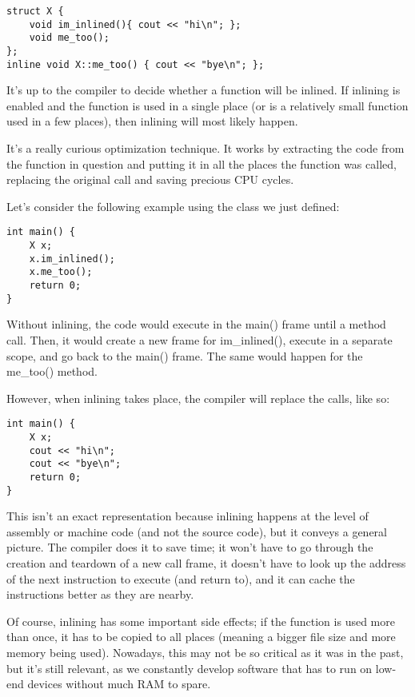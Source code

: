 \begin{lstlisting}[style=styleCXX]
struct X {
	void im_inlined(){ cout << "hi\n"; };
	void me_too();
};
inline void X::me_too() { cout << "bye\n"; };
\end{lstlisting} 

It's up to the compiler to decide whether a function will be inlined. If inlining is enabled and the function is used in a single place (or is a relatively small function used in a few places), then inlining will most likely happen.

It's a really curious optimization technique. It works by extracting the code from the function in question and putting it in all the places the function was called, replacing the original call and saving precious CPU cycles.

Let's consider the following example using the class we just defined:

\begin{lstlisting}[style=styleCXX]
int main() {
	X x;
	x.im_inlined();
	x.me_too();
	return 0;
}
\end{lstlisting} 

Without inlining, the code would execute in the main() frame until a method call. Then, it would create a new frame for im\_inlined(), execute in a separate scope, and go back to the main() frame. The same would happen for the me\_too() method.

However, when inlining takes place, the compiler will replace the calls, like so:

\begin{lstlisting}[style=styleCXX]
int main() {
	X x;
	cout << "hi\n";
	cout << "bye\n";
	return 0;
}
\end{lstlisting} 

This isn't an exact representation because inlining happens at the level of assembly or machine code (and not the source code), but it conveys a general picture.
The compiler does it to save time; it won't have to go through the creation and teardown of a new call frame, it doesn't have to look up the address of the next instruction to execute (and return to), and it can cache the instructions better as they are nearby.

Of course, inlining has some important side effects; if the function is used more than once, it has to be copied to all places (meaning a bigger file size and more memory being used). Nowadays, this may not be so critical as it was in the past, but it's still relevant, as we constantly develop software that has to run on low-end devices without much RAM to spare.

